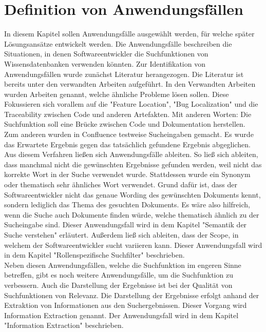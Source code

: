 \chapter{Definition von Anwendungsfällen}
In diesem Kapitel sollen Anwendungsfälle ausgewählt werden, für welche später Lösungsansätze entwickelt werden.
Die Anwendungsfälle beschreiben die Situationen, in denen Softwareentwickler die Suchfunktionen von Wissensdatenbanken verwenden könnten.
Zur Identifikation von Anwendungsfällen wurde zunächst Literatur herangezogen.
Die Literatur ist bereits unter den verwandten Arbeiten aufgeführt.
In den Verwandten Arbeiten wurden Arbeiten genannt, welche ähnliche Probleme lösen sollen.
Diese Fokussieren sich vorallem auf die "Feature Location", "Bug Localization" und die Traceability zwischen Code und anderen Artefakten.
Mit anderen Worten: Die Suchfunktion soll eine Brücke zwischen Code und Dokumentation herstellen.\\

Zum anderen wurden in Confluence testweise Sucheingaben gemacht.
Es wurde das Erwartete Ergebnis gegen das tatsächlich gefundene Ergebnis abgeglichen.
Aus diesem Verfahren ließen sich Anwendungsfälle ableiten.
So ließ sich ableiten, dass manchmal nicht die gewünschten Ergebnisse gefunden werden, weil nicht das korrekte Wort in der Suche verwendet wurde.
Stattdessen wurde ein Synonym oder thematisch sehr ähnliches Wort verwendet.
Grund dafür ist, dass der Softwareentwickler nicht das genaue Wording des gewünschten Dokuments kennt, sondern lediglich das Thema des gesuchten Dokuments.
Es wäre also hilfreich, wenn die Suche auch Dokumente finden würde, welche thematisch ähnlich zu der Sucheingabe sind.
Dieser Anwendungsfall wird in dem Kapitel "Semantik der Suche verstehen" erläutert.
Außerdem ließ sich ableiten, dass der Scope, in welchem der Softwareentwickler sucht variieren kann.
Dieser Anwendungsfall wird in dem Kapitel "Rollenspezifische Suchfilter" beschrieben.\\

Neben diesen Anwendungsfällen, welche die Suchfunktion im engeren Sinne betreffen, gibt es noch weitere Anwendungsfälle, um die Suchfunktion zu verbessern.
Auch die Darstellung der Ergebnisse ist bei der Qualität von Suchfunktionen von Relevanz.
Die Darstellung der Ergebnisse erfolgt anhand der Extraktion von Informationen aus den Suchergebnissen.
Dieser Vorgang wird Information Extraction genannt.
Der Anwendungsfall wird in dem Kapitel "Information Extraction" beschrieben.\\

